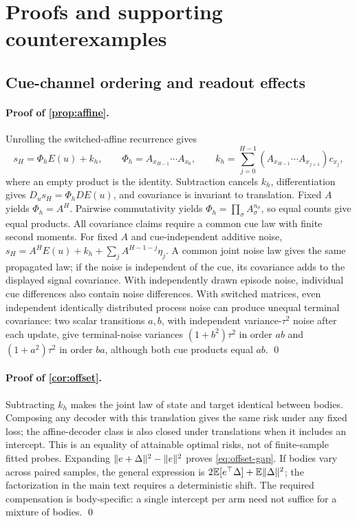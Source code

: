 \section{Proofs and supporting counterexamples}
\label{app:proofs}

\subsection{Cue-channel ordering and readout effects}

\paragraph{Proof of \cref{prop:affine}.}
Unrolling the switched-affine recurrence gives
\begin{equation}
 s_H=\Phi_hE(u)+k_h,\qquad
 \Phi_h=A_{x_{H-1}}\cdots A_{x_0},\qquad
 k_h=\sum_{j=0}^{H-1}
       (A_{x_{H-1}}\cdots A_{x_{j+1}})c_{x_j},
 \label{eq:unrolled-switched}
\end{equation}
where an empty product is the identity. Subtraction cancels $k_h$,
differentiation gives $D_us_H=\Phi_hDE(u)$, and covariance is invariant to
translation. Fixed $A$ yields $\Phi_h=A^H$. Pairwise commutativity yields
$\Phi_h=\prod_\sigma A_\sigma^{n_\sigma}$, so equal counts give equal products.
All covariance claims require a common cue law with finite second moments.
For fixed $A$ and cue-independent additive noise,
$s_H=A^HE(u)+k_h+\sum_jA^{H-1-j}\eta_j$. A common joint noise law gives the
same propagated law; if the noise is independent of the cue, its covariance
adds to the displayed signal covariance. With independently drawn episode
noise, individual cue differences also contain noise differences. With
switched matrices, even independent identically distributed process noise can
produce unequal terminal covariance: two scalar transitions $a,b$, with
independent variance-$\tau^2$ noise after each update, give terminal-noise
variances $(1+b^2)\tau^2$ in order $ab$ and $(1+a^2)\tau^2$ in order $ba$,
although both cue products equal $ab$. \qed

\paragraph{Proof of \cref{cor:offset}.}
Subtracting $k_h$ makes the joint law of state and target identical between
bodies. Composing any decoder with this translation gives the same risk under
any fixed loss; the affine-decoder class is also closed under translations
when it includes an intercept. This is an equality of attainable optimal
risks, not of finite-sample fitted probes. Expanding
$\lVert e+\Delta \rVert^2-\lVert e \rVert^2$ proves \cref{eq:offset-gap}.
If bodies vary across paired samples, the general expression is
$2\mathbb{E}[e^\top\Delta]+\mathbb{E}\lVert \Delta \rVert^2$; the factorization in the main text
requires a deterministic shift. The required compensation is body-specific:
a single intercept per arm need not suffice for a mixture of bodies. \qed

